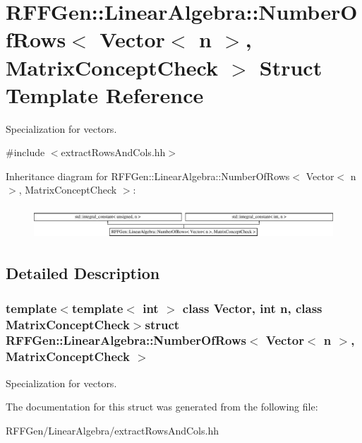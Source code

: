 \hypertarget{structRFFGen_1_1LinearAlgebra_1_1NumberOfRows_3_01Vector_3_01n_01_4_00_01MatrixConceptCheck_01_4}{\section{R\-F\-F\-Gen\-:\-:Linear\-Algebra\-:\-:Number\-Of\-Rows$<$ Vector$<$ n $>$, Matrix\-Concept\-Check $>$ Struct Template Reference}
\label{structRFFGen_1_1LinearAlgebra_1_1NumberOfRows_3_01Vector_3_01n_01_4_00_01MatrixConceptCheck_01_4}
}


Specialization for vectors.  




{\ttfamily \#include $<$extract\-Rows\-And\-Cols.\-hh$>$}

Inheritance diagram for R\-F\-F\-Gen\-:\-:Linear\-Algebra\-:\-:Number\-Of\-Rows$<$ Vector$<$ n $>$, Matrix\-Concept\-Check $>$\-:\begin{figure}[H]
\begin{center}
\leavevmode
\includegraphics[height=1.196581cm]{structRFFGen_1_1LinearAlgebra_1_1NumberOfRows_3_01Vector_3_01n_01_4_00_01MatrixConceptCheck_01_4}
\end{center}
\end{figure}


\subsection{Detailed Description}
\subsubsection*{template$<$template$<$ int $>$ class Vector, int n, class Matrix\-Concept\-Check$>$struct R\-F\-F\-Gen\-::\-Linear\-Algebra\-::\-Number\-Of\-Rows$<$ Vector$<$ n $>$, Matrix\-Concept\-Check $>$}

Specialization for vectors. 

The documentation for this struct was generated from the following file\-:\begin{DoxyCompactItemize}
\item 
R\-F\-F\-Gen/\-Linear\-Algebra/extract\-Rows\-And\-Cols.\-hh\end{DoxyCompactItemize}
